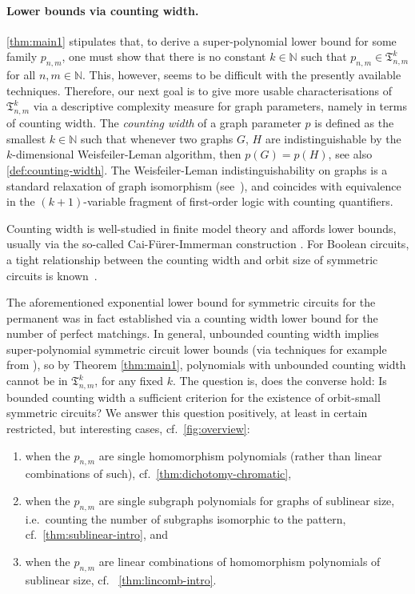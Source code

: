 \documentclass[11pt, DIV=15]{scrarticle}
\theoremstyle{definition}
\theoremstyle{plain}
\theoremstyle{remark}
\newcommand{\bbN}{\mathbb{N}}
\begin{document}
\paragraph{Lower bounds via counting width.}
\cref{thm:main1} stipulates that, to derive a super-polynomial lower bound for some family $p_{n,m}$, one must show that there is no constant $k \in \bbN$ such that $p_{n,m} \in \mathfrak{T}^k_{n,m}$ for all $n,m \in \bbN$. 
This, however, seems to be difficult with the presently available techniques. 
Therefore, our next goal is to give more usable characterisations of $\mathfrak{T}^k_{n,m}$
via a descriptive complexity measure for graph parameters, namely in terms of counting width. 
The \emph{counting width} \cite{dawar_definability_2017,dawar_notions_2025} of a graph parameter $p$ is defined as the smallest $k \in \bbN$ such that whenever two graphs $G$, $H$ are indistinguishable by the $k$-dimensional Weisfeiler-Leman algorithm, then $p(G) = p(H)$, see also \cref{def:counting-width}.  
The Weisfeiler-Leman indistinguishability on graphs is a standard relaxation of graph
isomorphism (see~\cite{CFI,kiefer2020WL}), and coincides with equivalence in the $(k+1)$-variable fragment of first-order logic with counting quantifiers.

Counting width is well-studied in finite model theory and affords lower bounds, usually via the so-called Cai-F\"urer-Immerman construction \cite{CFI}.
For Boolean
circuits, a tight relationship
between the counting width and orbit size of symmetric
circuits is known~\cite{anderson_symmetric_2017}.

The aforementioned exponential lower bound for symmetric circuits for the permanent was in fact established via a counting width lower bound for the number of perfect matchings. In general, unbounded counting width implies super-polynomial symmetric circuit lower bounds (via techniques for example from \cite{anderson_symmetric_2017,  dawar_symmetric_2025}), so by Theorem \ref{thm:main1}, polynomials with unbounded counting width cannot be in $\mathfrak{T}_{n,m}^k$, for any fixed $k$.
The question is, does the converse hold: Is bounded counting width a sufficient criterion for the existence of orbit-small symmetric circuits?
We answer this question positively, at least in certain restricted, but interesting cases, cf.\ \cref{fig:overview}:
\begin{enumerate}
	\item\label{it:hom} when the $p_{n,m}$ are single homomorphism polynomials (rather than linear combinations of such), cf.\ \cref{thm:dichotomy-chromatic},
	\item\label{it:sub} when the $p_{n,m}$ are single subgraph polynomials for graphs of sublinear size, i.e.\ counting  the number of subgraphs isomorphic to the pattern, cf.\ \cref{thm:sublinear-intro}, and
	\item\label{it:lincomb} when the $p_{n,m}$ are linear combinations of homomorphism polynomials of sublinear size, cf. \ \cref{thm:lincomb-intro}.
\end{enumerate}
\end{document}
